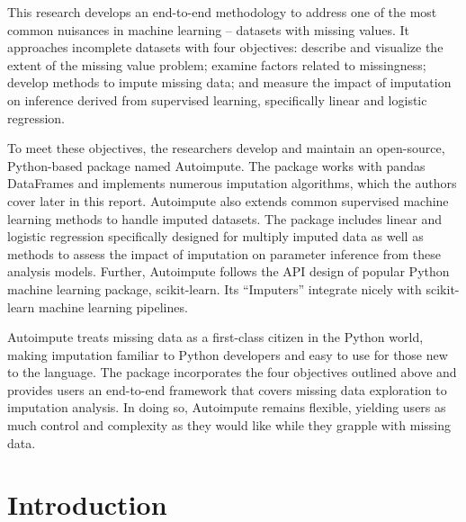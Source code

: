\documentclass[12pt,oneside]{chicagocapstone}
\begin{document}
  \begin{executive}
    This research develops an end-to-end methodology to address one of the
    most common nuisances in machine learning -- datasets with missing
    values. It approaches incomplete datasets with four objectives: describe
    and visualize the extent of the missing value problem; examine factors
    related to missingness; develop methods to impute missing data; and
    measure the impact of imputation on inference derived from supervised
    learning, specifically linear and logistic regression.
    
    To meet these objectives, the researchers develop and maintain an
    open-source, Python-based package named Autoimpute. The package works
    with pandas DataFrames and implements numerous imputation algorithms,
    which the authors cover later in this report. Autoimpute also extends
    common supervised machine learning methods to handle imputed datasets.
    The package includes linear and logistic regression specifically
    designed for multiply imputed data as well as methods to assess the
    impact of imputation on parameter inference from these analysis models.
    Further, Autoimpute follows the API design of popular Python machine
    learning package, scikit-learn. Its ``Imputers'' integrate nicely with
    scikit-learn machine learning pipelines.
    
    Autoimpute treats missing data as a first-class citizen in the Python
    world, making imputation familiar to Python developers and easy to use
    for those new to the language. The package incorporates the four
    objectives outlined above and provides users an end-to-end framework
    that covers missing data exploration to imputation analysis. In doing
    so, Autoimpute remains flexible, yielding users as much control and
    complexity as they would like while they grapple with missing data.
  \end{executive}




  \hypersetup{linkcolor=black}
  \setcounter{tocdepth}{2}
  \tableofcontents

  \listoffigures

  \listoftables


\mainmatter %
\pagestyle{fancyplain} %

\chapter*{Introduction}\label{introduction}
\end{document}
